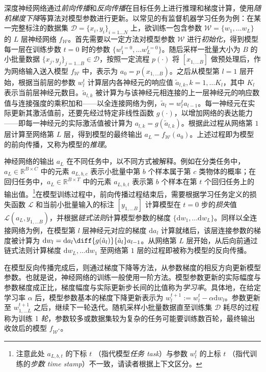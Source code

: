 \documentclass[
  fontset = mac,
]{shtthesis}
\providecommand{\FpNet}{f_{\mathcal{W}}}
\begin{document}
深度神经网络通过\emph{前向传播}和\emph{反向传播}在目标任务上进行推理和梯度计算，使用\emph{随机梯度下降}等算法对模型参数进行更新。以常见的有监督机器学习任务为例：在某一完整标注的数据集 $\mathcal{D} = \{x_i, y_i\}_{i=1\ldots N}$ 上，欲训练一包含参数 $\mathcal{W} = \{w_1, \ldots w_L\}$ 的 $L$ 层神经网络 $\FpNet$。首先需要以一定方法对模型参数 $\mathcal{W}$ 进行\emph{初始化}，得到模型每一层在训练步数 $t=0$ 时的参数 $\{w_1^{t=0}, \ldots w_L^{t=0}\}$。随后采样一批量大小为 $B$ 的小批量数据 $\{x_j, y_j\}_{j=1\ldots B} \in \mathcal{D}$，按照一定流程 $p(\cdot)$ 将 $[x_{1, \ldots B}]$ 做预处理后，作为网络输入送入模型 $\FpNet$ 中，表示为 $a_0 = p(x_{1, \ldots B})$。之后从模型第 $l=1$ 层开始，根据当前层的参数 $w_l^t$ 计算层内各神经元的响应值 $\tilde{a}_{l, k}, k = 1, \ldots K_l$，其中 $K_l$ 表示当前层神经元数目。$\tilde{a}_{l, k}$ 被计算为与该神经元相连接的上一层神经元的响应数值与连接强度的乘积加和——以全连接网络为例，$\tilde{a}_l = w_l^t a_{l-1}$。每一神经元在实际更新其激活值前，还要先经过特定非线性函数 $g(\cdot)$，以增加网络的表达能力——即每一神经元的实际激活值被计算为 $a_{l, k} = g(\tilde{a}_{l, k})$。根据此过程从网络第 $1$ 层计算至网络第 $L$ 层，得到模型的最终输出 $a_L = \FpNet(a_0)$。上述过程即为模型的前向传播，又称为模型的\emph{推理}。

神经网络的输出 $a_L$ 在不同任务中，以不同方式被解释。例如在分类任务中，$a_L \in \mathbb{R}^{B \times C}$ 中的元素 $a_{L, b, c}$ 表示小批量中第 $b$ 个样本属于第 $c$ 类物体的概率；在回归任务中，$a_L \in \mathbb{R}^{B \times T}$ 中的元素 $a_{L, b, t}$ 表示第 $b$ 个样本在第 $t$ 个回归任务上的输出值。\footnote{注意此处 $a_{L, b, t}$ 的下标 $t$ （指代模型\emph{任务 task}）与参数 $w_l^t$ 的上标 $t$ （指代训练的\emph{步数 time stamp}）不一致，请读者根据上下文区分。}在模型训练过程中，前向传播过程结束后，需要根据学习任务定义的损失函数 $\mathcal{L}$ 和当前小批量输入的标注 $[y_{1, \ldots B}]$ 计算模型在 $t=0$ 步的\emph{损失}值 $\mathcal{L}(a_L, y_{1, \ldots B})$，并根据\emph{链式法则}计算模型参数的梯度 $\{\mathrm{d}w_1, \ldots \mathrm{d}w_L\}$。同样以全连接网络为例，在模型第 $l$ 层神经元对应的梯度 $\mathrm{d} a_l$ 计算就绪后，该层连接参数的梯度被计算为 $\mathrm{d} w_l = \mathrm{d} a_l \diff{g(\tilde{a}_l)}{\tilde{a}_l} a_{l-1}$。从网络第 $L$ 层开始，从后向前通过链式法则计算梯度 $\mathrm{d}w_L, \ldots \mathrm{d}w_1$ 至网络第 $1$ 层的过程即被称为模型的反向传播。

在模型反向传播完成后，则通过梯度下降等方法，从参数梯度的相反方向更新模型参数。也就是说，神经网络的训练一般使用一阶方法。模型参数更新的实际幅度与参数梯度成正比，梯度幅度与实际更新步长间的比值称为\emph{学习率}。具体地，在给定学习率 $\alpha$ 后，模型参数基本的梯度下降更新表示为 $w_l^{t+1} := w_l^t - \alpha \mathrm{d} w_l$。参数更新至 $w_{1, \ldots L}^{t+1}$ 之后，继续下一轮迭代。随机采样小批量数据直至训练集 $\mathcal{D}$ 耗尽的过程称为训练 1 \emph{轮}，参数较多或数据集较为复杂的任务可能要训练数百轮，最终输出收敛后的模型 $f_{\mathcal{W}^*}$。
\end{document}
